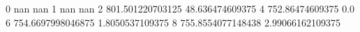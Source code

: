 0 nan nan
1 nan nan
2 801.501220703125 48.636474609375
4 752.86474609375 0.0
6 754.6697998046875 1.8050537109375
8 755.8554077148438 2.99066162109375
